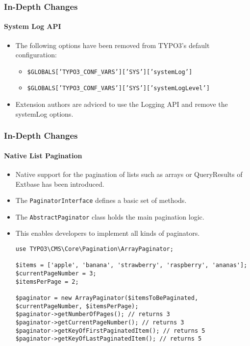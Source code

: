 
\begin{frame}[fragile]
	\frametitle{In-Depth Changes}
	\framesubtitle{System Log API}

	\lstset{basicstyle=\tiny\ttfamily}

	\begin{itemize}
		\item The following options have been removed from TYPO3's default configuration:

			\begin{itemize}\smaller
				\item \texttt{\$GLOBALS['TYPO3\_CONF\_VARS']['SYS']['systemLog']}
				\item \texttt{\$GLOBALS['TYPO3\_CONF\_VARS']['SYS']['systemLogLevel']}
			\end{itemize}\normalsize

		\item Extension authors are adviced to use the Logging API and remove the systemLog options.
	\end{itemize}

\end{frame}


\begin{frame}[fragile]
	\frametitle{In-Depth Changes}
	\framesubtitle{Native List Pagination}

	\lstset{basicstyle=\tiny\ttfamily}

	\begin{itemize}
		\item Native support for the pagination of lists such as arrays or QueryResults of Extbase has been introduced.
		\item The \texttt{PaginatorInterface} defines a basic set of methods.
		\item The \texttt{AbstractPaginator} class holds the main pagination logic.
		\item This enables developers to implement all kinds of paginators.
\begin{lstlisting}
use TYPO3\CMS\Core\Pagination\ArrayPaginator;

$items = ['apple', 'banana', 'strawberry', 'raspberry', 'ananas'];
$currentPageNumber = 3;
$itemsPerPage = 2;

$paginator = new ArrayPaginator($itemsToBePaginated, $currentPageNumber, $itemsPerPage);
$paginator->getNumberOfPages(); // returns 3
$paginator->getCurrentPageNumber(); // returns 3
$paginator->getKeyOfFirstPaginatedItem(); // returns 5
$paginator->getKeyOfLastPaginatedItem(); // returns 5
\end{lstlisting}

	\end{itemize}

\end{frame}

